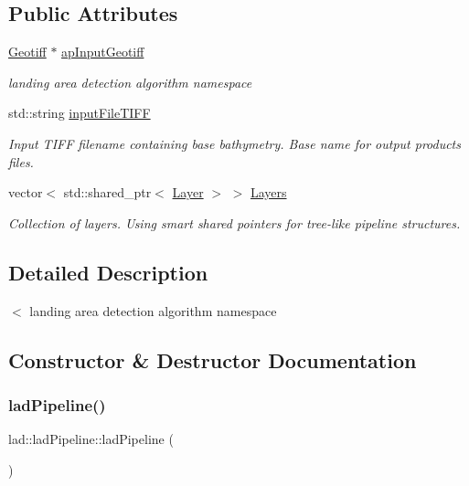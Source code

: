 \subsection*{Public Attributes}
\begin{DoxyCompactItemize}
\item 
\hyperlink{class_geotiff}{Geotiff} $\ast$ \hyperlink{classlad_1_1lad_pipeline_a1ecbd2ad5ac586de2876ee2e59cc1b97}{ap\+Input\+Geotiff}
\begin{DoxyCompactList}\small\item\em landing area detection algorithm namespace \end{DoxyCompactList}\item 
std\+::string \hyperlink{classlad_1_1lad_pipeline_a2312bba58d0b3b44e72fd6bea4e4b35c}{input\+File\+T\+I\+FF}
\begin{DoxyCompactList}\small\item\em Input T\+I\+FF filename containing base bathymetry. Base name for output products files. \end{DoxyCompactList}\item 
vector$<$ std\+::shared\+\_\+ptr$<$ \hyperlink{classlad_1_1_layer}{Layer} $>$ $>$ \hyperlink{classlad_1_1lad_pipeline_a7c0702fe312deebd185bd3a3a5a02a53}{Layers}
\begin{DoxyCompactList}\small\item\em Collection of layers. Using smart shared pointers for tree-\/like pipeline structures. \end{DoxyCompactList}\end{DoxyCompactItemize}


\subsection{Detailed Description}
$<$ landing area detection algorithm namespace 

\subsection{Constructor \& Destructor Documentation}
\mbox{\label{classlad_1_1lad_pipeline_a47ebdd8f4797a0a7ea562682e2f311c3}} 
\subsubsection{\texorpdfstring{lad\+Pipeline()}{ladPipeline()}}
{\footnotesize\ttfamily lad\+::lad\+Pipeline\+::lad\+Pipeline (\begin{DoxyParamCaption}{ }\end{DoxyParamCaption})\hspace{0.3cm}{\ttfamily [inline]}}




